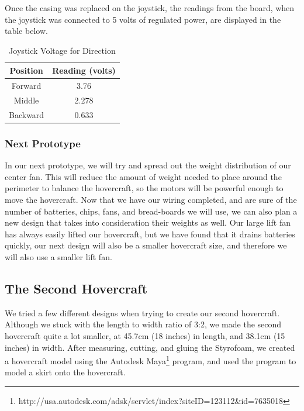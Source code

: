 Once the casing was replaced on the joystick, the readings from the board, when the joystick was connected to 5 volts of regulated power, are displayed in the table below.

\begin{table}
\caption{Joystick Voltage for Direction}
\begin{center}
\begin{tabular}{ c c }
  Position & Reading (volts) \\
  \hline
  Forward & 3.76 \\
  Middle & 2.278 \\
  Backward & 0.633 \\
\end{tabular}
\end{center}
\label{voltagePotentiometerTable}
\end{table}

\subsubsection{Next Prototype}
In our next prototype, we will try and spread out the weight distribution of our center fan. This will reduce the amount of weight needed to place around the perimeter to balance the hovercraft, so the motors will be powerful enough to move the hovercraft. Now that we have our wiring completed, and are sure of the number of batteries, chips, fans, and bread-boards we will use, we can also plan a new design that takes into consideration their weights as well. Our large lift fan has always easily lifted our hovercraft, but we have found that it drains batteries quickly, our next design will also be a smaller hovercraft size, and therefore we will also use a smaller lift fan.

\subsection{The Second Hovercraft}
We tried a few different designs when trying to create our second hovercraft. Although we stuck with the length to width ratio
of 3:2, we made the second hovercraft quite a lot smaller, at 45.7cm (18 inches) in length, and 38.1cm (15 inches) in width.
After measuring, cutting, and gluing the Styrofoam, we created a hovercraft model using the Autodesk Maya\footnote{ http://usa.autodesk.com/adsk/servlet/index?siteID=123112\&id=7635018 }
program, and used the program to model a skirt onto the hovercraft.

